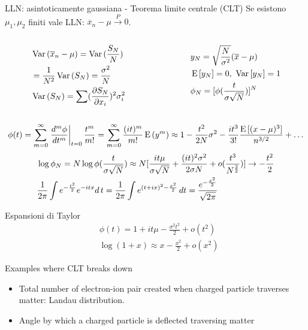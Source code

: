 \begin{frame}{LLN: asintoticamente gaussiana - Teorema limite centrale (CLT)}
Se esistono $\mu_1, \mu_2$ finiti vale LLN: $\overline{x}_n-\mu\xrightarrow{P}0$.
\begin{columns}[T]
\begin{column}{0.5\textwidth}
\begin{align*}
&\var{(\overline{x}_n-\mu)}=\var{(\frac{S_N}{N})}\\
&=\frac{1}{N^2}\var{(S_N)}=\frac{\sigma^2}{N}\\
&\var{(S_N)}=\sum(\PDy{x_i}{S_N})^2\sigma_i^2
\end{align*}
\end{column}
\begin{column}{0.5\textwidth}
\begin{align*}
&y_N=\sqrt{\frac{N}{\sigma^2}}(\overline{x}-\mu)\\
&\E{[y_N]}=0,\ \var{[y_N]}=1\\
&\phi_N=[\phi(\frac{t}{\sigma\sqrt{N}})]^N
\end{align*}
\end{column}
\end{columns}
\[\phi(t)=\sum_{m=0}^{\infty}\left.\frac{d^m\phi}{dt^m}\right|_{t=0}\frac{t^m}{m!}=\sum_{m=0}^{\infty}\frac{(it)^m}{m!}\E{(y^m)}\approx1-\frac{t^2}{2N}\sigma^2-\frac{it^3}{3!}\frac{\E{[(x-\mu)^3]}}{n\expy{3/2}}+\ldots\]
\begin{align*}
&\log{\phi_N}=N\log{\phi(\frac{t}{\sigma\sqrt{N}})}\approx N[\frac{it\mu}{\sigma\sqrt{N}}+\frac{(it)^2\sigma^2}{2\sigma N}+o(\frac{t^3}{N\expy{\frac{3}{2}}})]\to-\frac{t^2}{2}\\
&\frac{1}{2\pi}\int\exp{-\frac{t^2}{2}}\exp{-itx}d\,t=\frac{1}{2\pi}\int\exp{(t+ix)^2-\frac{x^2}{2}}\,dt=\frac{\exp{-\frac{x^2}{2}}}{\sqrt{2\pi}}
\end{align*}
\end{frame}

\begin{wordonframe}{Espansioni di Taylor}
\begin{align*}
&\phi(t)=1+it\mu-\frac{\sigma^2t^2}{2}+o(t^2)\\
&\log{(1+x)}\approx x-\frac{x^2}{2}+o(x^2)
\end{align*}
\end{wordonframe}

\begin{frame}{Examples where CLT breaks down}
\begin{itemize}
\item Total number of electron-ion pair created when charged particle traverses matter: Landau distribution.
\item Angle by which a charged particle is deflected traversing matter
\end{itemize}
\end{frame}

